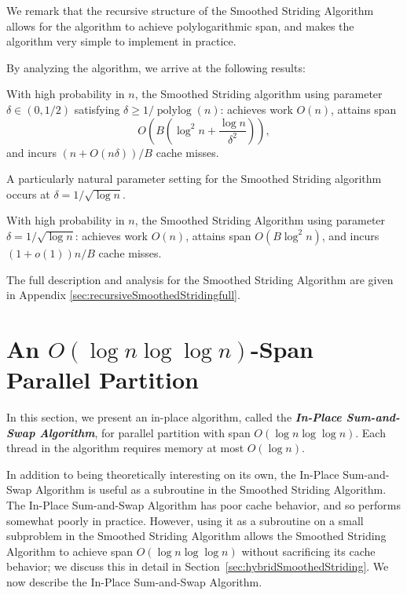 \documentclass[a4paper,UKenglish,cleveref, autoref, thm-restate]{lipics-v2019}
\DeclareMathOperator{\polylog}{\text{polylog}}
\newcommand{\defn}[1]{{\textit{\textbf{\boldmath #1}}}}
\begin{document}
We remark that the recursive structure of the Smoothed Striding
Algorithm allows for the algorithm to achieve polylogarithmic
span, and makes the algorithm very simple to implement in
practice.

By analyzing the algorithm, we arrive at the following results:

\begin{theorem}
  With high probability in $n$, the Smoothed Striding
  algorithm using parameter $\delta \in(0,1/2)$ satisfying
  $\delta \ge 1 / \polylog(n)$: achieves work $O(n)$, attains
  span $$O\left(B\left(\log^2 n + \frac{\log
  n}{\delta^2}\right)\right),$$ and incurs $(n+O(n \delta))/B$
  cache misses. 
\end{theorem}

A particularly natural parameter setting for the
Smoothed Striding algorithm occurs at $\delta = 1 / \sqrt{\log n}$.
\begin{corollary}
   With high probability in $n$,
  the Smoothed Striding Algorithm using parameter
  $\delta=1/\sqrt{\log n}$: achieves work $O(n)$, attains span
  $O(B\log^2 n)$, and incurs $(1 + o(1))n/B$ cache misses. 
\end{corollary}


The full description and analysis for the Smoothed Striding Algorithm are given in  Appendix
\ref{sec:recursiveSmoothedStridingfull}.




\section{An $O(\log n \log \log n)$-Span Parallel Partition}
\label{sec:blockedprefixsumpartitionalg}

In this section, we present an in-place algorithm, called the
\defn{In-Place Sum-and-Swap Algorithm}, for parallel
partition with span $O(\log n \log \log n)$. Each thread in the
algorithm requires memory at most $O(\log n)$. 

In addition to being theoretically interesting on its own, the
In-Place Sum-and-Swap Algorithm is useful as a subroutine in the
Smoothed Striding Algorithm. The In-Place Sum-and-Swap Algorithm
has poor cache behavior, and so performs somewhat poorly in
practice. However, using it as a subroutine on a small subproblem
in the Smoothed Striding Algorithm allows the Smoothed Striding
Algorithm to achieve span $O(\log n \log\log n)$ without
sacrificing its cache behavior; we discuss this in detail in
Section~\ref{sec:hybridSmoothedStriding}. We now describe the
In-Place Sum-and-Swap Algorithm. 
\end{document}
